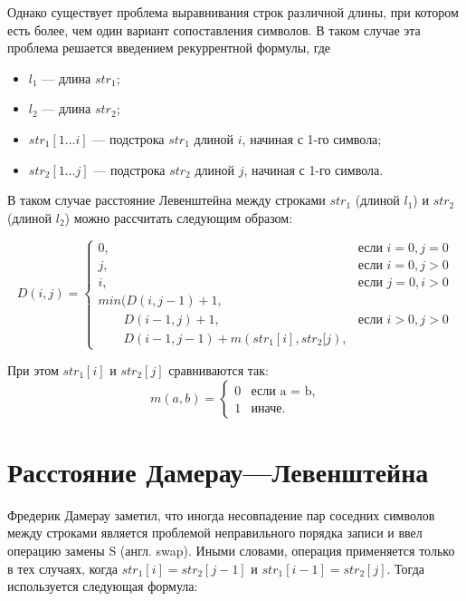 Однако существует проблема выравнивания строк различной длины, при котором есть более, чем один вариант сопоставления символов. 
В таком случае эта проблема решается введением рекуррентной формулы, где

\begin{itemize}
	\item $l_{1}$ --- длина $str_{1}$;
	\item $l_{2}$ --- длина $str_{2}$;
	\item $str_{1}[1 \ldots i]$ --- подстрока $str_{1}$ длиной $i$, начиная с 1-го символа;
	\item $str_{2}[1 \ldots j]$ --- подстрока $str_{2}$ длиной $j$, начиная с 1-го символа.
\end{itemize}

В таком случае расстояние Левенштейна между строками $str_{1}$ (длиной $l_{1}$) и $str_{2}$ (длиной $l_{2}$) можно рассчитать следующим образом:

\begin{equation}
	\label{equation:lev}
	D(i, j) = \begin{cases}
		0, & \textrm{$\mbox{если }i = 0, j = 0$}\\
		j, & \textrm{$\mbox{если }i = 0, j > 0$}\\
		i, & \textrm{$\mbox{если }j = 0, i > 0$}\\
		min(D(i, j - 1)+1,\\
		\qquad D(i - 1, j) + 1, &\textrm{$\mbox{если }i > 0, j > 0$}\\
		\qquad D(i - 1, j - 1) + m(str_{1}[i],str_{2}[j),
	\end{cases}
\end{equation}

При этом $str_{1}[i]$ и $str_{2}[j]$ сравниваются так:
\begin{equation}
	\label{equation:change}
	m(a, b) = \begin{cases}
		0 &\text{если a = b,}\\
		1 &\text{иначе.}
	\end{cases}
\end{equation}

\section{Расстояние Дамерау---Левенштейна}

Фредерик Дамерау заметил, что иногда несовпадение пар соседних символов между строками является проблемой неправильного порядка записи и ввел операцию замены S (англ. swap). 
Иными словами, операция применяется только в тех случаях, когда $str_{1}[i] = str_{2}[j - 1]$ и $str_{1}[i - 1] = str_{2}[j]$. Тогда используется следующая формула:

